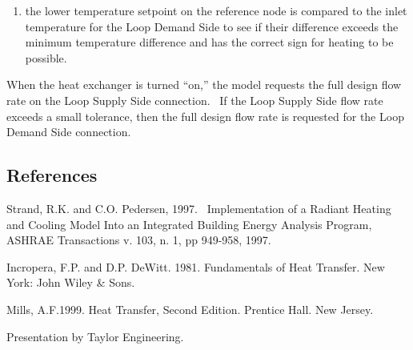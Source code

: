 \begin{enumerate}
\def\labelenumi{\arabic{enumi})}
\setcounter{enumi}{2}
\tightlist
\item
  the lower temperature setpoint on the reference node is compared to the inlet temperature for the Loop Demand Side to see if their difference exceeds the minimum temperature difference and has the correct sign for heating to be possible.
\end{enumerate}

When the heat exchanger is turned ``on,'' the model requests the full design flow rate on the Loop Supply Side connection.~ If the Loop Supply Side flow rate exceeds a small tolerance, then the full design flow rate is requested for the Loop Demand Side connection.

\subsection{References}\label{references-5-002}

Strand, R.K. and C.O. Pedersen, 1997.~ Implementation of a Radiant Heating and Cooling Model Into an Integrated Building Energy Analysis Program, ASHRAE Transactions v. 103, n. 1, pp 949-958, 1997.

Incropera, F.P. and D.P. DeWitt. 1981. Fundamentals of Heat Transfer. New York: John Wiley \& Sons.

Mills, A.F.1999. Heat Transfer, Second Edition. Prentice Hall. New Jersey.

Presentation by Taylor Engineering.
